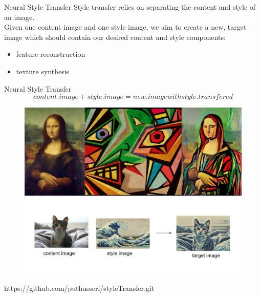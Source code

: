 
\begin{frame}[fragile]{Neural Style Transfer}
   Style transfer relies on separating the content and style of an image. 
   \\
   Given one content image and one style image, we aim to create a new, target image which should contain our desired content and style components:
    \begin{itemize}
        \item feature reconstruction
        \item texture synthesis
    \end{itemize}

\end{frame}


\begin{frame}[fragile]{Neural Style Transfer}
    \begin{equation}
        content.image + style.image =  new.image with style.transfered
    \end{equation}
    \begin{figure}[ht]
      \hspace*{-1cm}\includegraphics[width=0.5\linewidth]{styletransfer} \\
      \hspace*{-1cm}\includegraphics[width=0.7\linewidth]{styletransfercat} 
    \end{figure}
    https://github.com/puthusseri/styleTransfer.git
\end{frame}


